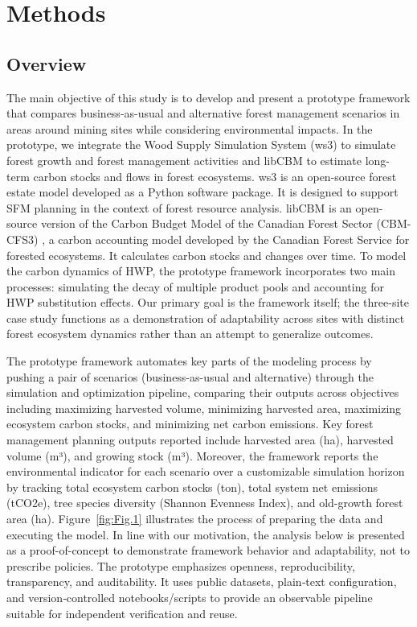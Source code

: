 \documentclass[preprint,12pt]{elsarticle}
\begin{document}
\section{Methods}
\label{sec:methods-overview}
\subsection{Overview}
\label{sec: Overview}
The main objective of this study is to develop and present a prototype framework that compares business-as-usual and alternative forest management scenarios in areas around mining sites while considering environmental impacts. In the prototype, we integrate the Wood Supply Simulation System (ws3) to simulate forest growth and forest management activities \citep{Paradis2025_ws3_preprint} and libCBM \citep{libcbmpy} to estimate long-term carbon stocks and flows in forest ecosystems. ws3 is an open-source forest estate model developed as a Python software package. It is designed to support SFM planning in the context of forest resource analysis. libCBM is an open-source version of the Carbon Budget Model of the Canadian Forest Sector (CBM-CFS3) \citep{KURZ2009480}, a carbon accounting model developed by the Canadian Forest Service for forested ecosystems. It calculates carbon stocks and changes over time. To model the carbon dynamics of HWP, the prototype framework incorporates two main processes: simulating the decay of multiple product pools and accounting for HWP substitution effects. Our primary goal is the framework itself; the three-site case study functions as a demonstration of adaptability across sites with distinct forest ecosystem dynamics rather than an attempt to generalize outcomes.

The prototype framework automates key parts of the modeling process by pushing a pair of scenarios (business-as-usual and alternative) through the simulation and optimization pipeline, comparing their outputs across objectives including maximizing harvested volume, minimizing harvested area, maximizing ecosystem carbon stocks, and minimizing net carbon emissions. Key forest management planning outputs reported include harvested area (ha), harvested volume (m³), and growing stock (m³). Moreover, the framework reports the environmental indicator for each scenario over a customizable simulation horizon by tracking total ecosystem carbon stocks (ton), total system net emissions (tCO2e), tree species diversity (Shannon Evenness Index), and old-growth forest area (ha). Figure~\ref{fig:Fig.1} illustrates the process of preparing the data and executing the model. In line with our motivation, the analysis below is presented as a proof-of-concept to demonstrate framework behavior and adaptability, not to prescribe policies. The prototype emphasizes openness, reproducibility, transparency, and auditability. It uses public datasets, plain‑text configuration, and version‑controlled notebooks/scripts to provide an observable pipeline suitable for independent verification and reuse.
\end{document}

